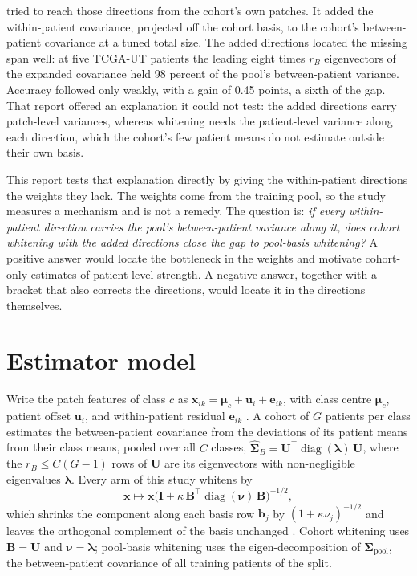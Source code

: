 \documentclass[11pt]{article}
\begin{document}
\citet{queisler2026withinPatientSpan} tried to reach those directions from the cohort's own patches. It added the within-patient covariance, projected off the cohort basis, to the cohort's between-patient covariance at a tuned total size. The added directions located the missing span well: at five TCGA-UT patients the leading eight times $r_B$ eigenvectors of the expanded covariance held 98 percent of the pool's between-patient variance. Accuracy followed only weakly, with a gain of 0.45 points, a sixth of the gap. That report offered an explanation it could not test: the added directions carry patch-level variances, whereas whitening needs the patient-level variance along each direction, which the cohort's few patient means do not estimate outside their own basis.

This report tests that explanation directly by giving the within-patient directions the weights they lack. The weights come from the training pool, so the study measures a mechanism and is not a remedy. The question is: \emph{if every within-patient direction carries the pool's between-patient variance along it, does cohort whitening with the added directions close the gap to pool-basis whitening?} A positive answer would locate the bottleneck in the weights and motivate cohort-only estimates of patient-level strength. A negative answer, together with a bracket that also corrects the directions, would locate it in the directions themselves.

\section{Estimator model}
\label{sec:model}
Write the patch features of class $c$ as $\mathbf x_{ik}=\boldsymbol\mu_c+\mathbf u_i+\mathbf e_{ik}$, with class centre $\boldsymbol\mu_c$, patient offset $\mathbf u_i$, and within-patient residual $\mathbf e_{ik}$ \citep{queisler2026centreError}. A cohort of $G$ patients per class estimates the between-patient covariance from the deviations of its patient means from their class means, pooled over all $C$ classes, $\hat{\boldsymbol\Sigma}_B=\mathbf U^\top\operatorname{diag}(\boldsymbol\lambda)\,\mathbf U$, where the $r_B\leq C(G-1)$ rows of $\mathbf U$ are its eigenvectors with non-negligible eigenvalues $\boldsymbol\lambda$. Every arm of this study whitens by
\begin{equation}
  \mathbf x\mapsto\mathbf x\bigl(\mathbf I+\kappa\,\mathbf B^\top\operatorname{diag}(\boldsymbol\nu)\,\mathbf B\bigr)^{-1/2},
  \label{eq:whiten}
\end{equation}
\noindent which shrinks the component along each basis row $\mathbf b_j$ by $(1+\kappa\nu_j)^{-1/2}$ and leaves the orthogonal complement of the basis unchanged \citep{queisler2026patientDirections}. Cohort whitening uses $\mathbf B=\mathbf U$ and $\boldsymbol\nu=\boldsymbol\lambda$; pool-basis whitening uses the eigen-decomposition of $\boldsymbol\Sigma_{\text{pool}}$, the between-patient covariance of all training patients of the split.
\end{document}

